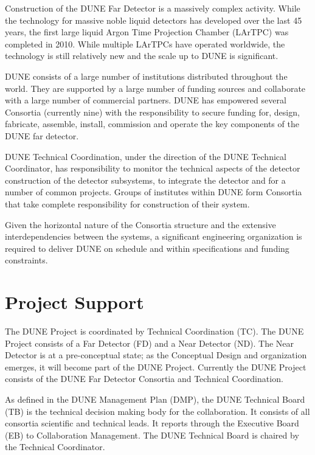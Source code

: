 Construction of the DUNE Far Detector is a massively complex
activity. While the technology for massive noble liquid detectors has
developed over the last 45 years, the first large liquid Argon Time
Projection Chamber (LArTPC) was completed in 2010. While multiple
LArTPCs have operated worldwide, the technology is still relatively
new and the scale up to DUNE is significant.

DUNE consists of a large number of institutions distributed throughout
the world. They are supported by a large number of funding sources and
collaborate with a large number of commercial partners. DUNE has
empowered several Consortia (currently nine) with the responsibility
to secure funding for, design, fabricate, assemble, install,
commission and operate the key components of the DUNE far detector.

DUNE Technical Coordination, under the direction of the DUNE Technical
Coordinator, has responsibility to monitor the technical aspects of
the detector construction of the detector subsystems, to integrate the
detector and for a number of common projects. Groups of institutes
within DUNE form Consortia that take complete responsibility for
construction of their system.

Given the horizontal nature of the Consortia structure and the
extensive interdependencies between the systems, a significant
engineering organization is required to deliver DUNE on schedule and
within specifications and funding constraints.



\section{Project Support}
\label{sec:fdsp-coord-supp}

The DUNE Project is coordinated by Technical Coordination (TC). The DUNE
Project consists of a Far Detector (FD) and a Near Detector (ND). The Near
Detector is at a pre-conceptual state; as the Conceptual Design and
organization emerges, it will become part of the DUNE
Project. Currently the DUNE Project consists of the DUNE Far Detector
Consortia and Technical Coordination.

As defined in the DUNE Management Plan (DMP), the DUNE Technical Board (TB) is
the technical decision making body for the collaboration. It consists
of all consortia scientific and technical leads. It reports through
the Executive Board (EB) to Collaboration Management. The DUNE Technical
Board is chaired by the Technical Coordinator.

